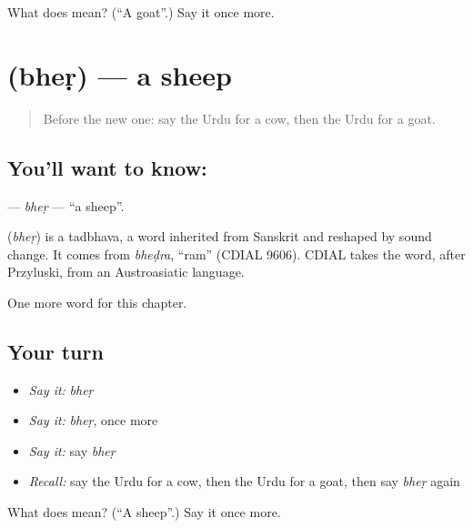 \begin{tcolorbox}[breakable,colback=teal!4,colframe=teal!35!black,title={Before you move on}]
What does  mean? (\textquotedblleft{}A goat\textquotedblright{}.) Say it once more.
\end{tcolorbox}
\section[\texorpdfstring{\ur{بھیڑ} (bheṛ)}{بھیڑ (bheṛ)}]{ (bheṛ) — a sheep}

\label{lesson:UR-C68-bher}



\begin{quote}
Before the new one: say the Urdu for a cow, then the Urdu for a goat.
\end{quote}

\subsection*{You'll want to know: }
\textbf{} — \emph{bheṛ} — \textquotedblleft{}a sheep\textquotedblright{}.

\begin{cousinweb}
\textbf{} (\emph{bheṛ}) is a tadbhava, a word inherited from Sanskrit and reshaped by sound change. It comes from \emph{bheḍra}, \textquotedblleft{}ram\textquotedblright{} (CDIAL 9606). CDIAL takes the word, after Przyluski, from an Austroasiatic language.
\end{cousinweb}

\begin{grammarlens}[title={What you've built}]
One more word for this chapter.
\end{grammarlens}

\subsection*{Your turn}
\begin{itemize}
\raggedright
  \item \emph{Say it:} \emph{bheṛ}
  \item \emph{Say it:} \emph{bheṛ}, once more
  \item \emph{Say it:} say \emph{bheṛ}
  \item \emph{Recall:} say the Urdu for a cow, then the Urdu for a goat, then say \emph{bheṛ} again
\end{itemize}

\begin{tcolorbox}[breakable,colback=teal!4,colframe=teal!35!black,title={Before you move on}]
What does  mean? (\textquotedblleft{}A sheep\textquotedblright{}.) Say it once more.
\end{tcolorbox}
